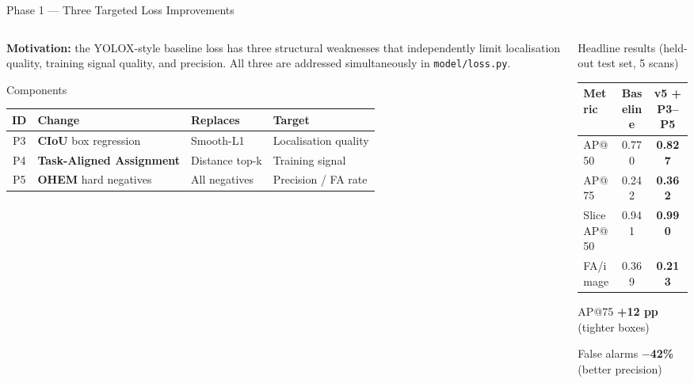 \documentclass[aspectratio=169, 10pt]{beamer}
\begin{document}
\begin{frame}{Phase 1 — Three Targeted Loss Improvements}
  \begin{columns}[T]
    \begin{column}{0.60\textwidth}
      \textbf{Motivation:} the YOLOX-style baseline loss has three structural weaknesses that
      independently limit localisation quality, training signal quality, and precision.
      All three are addressed simultaneously in \texttt{model/loss.py}.

      \vspace{10pt}
      \begin{block}{\small Components}
        \small
        \begin{tabular}{clll}
          \toprule
          ID & Change & Replaces & Target \\
          \midrule
          P3 & \textbf{CIoU} box regression    & Smooth-L1     & Localisation quality \\
          P4 & \textbf{Task-Aligned Assignment} & Distance top-k & Training signal     \\
          P5 & \textbf{OHEM} hard negatives     & All negatives  & Precision / FA rate  \\
          \bottomrule
        \end{tabular}
      \end{block}
    \end{column}
    \begin{column}{0.36\textwidth}
      \vspace{4pt}
      \begin{block}{\small Headline results (held-out test set, 5 scans)}
        \scriptsize
        \begin{tabular}{lcc}
          \toprule
          Metric & Baseline & \textbf{v5 + P3–P5} \\
          \midrule
          AP@50       & 0.770 & \textbf{0.827} \\
          AP@75       & 0.242 & \textbf{0.362} \\
          SliceAP@50  & 0.941 & \textbf{0.990} \\
          FA/image    & 0.369 & \textbf{0.213} \\
          \bottomrule
        \end{tabular}
      \end{block}

      \vspace{6pt}
      {\scriptsize AP@75 \textbf{+12 pp} (tighter boxes) \par
      False alarms \textbf{$-$42\%} (better precision)}
    \end{column}
  \end{columns}
\end{frame}
\end{document}
